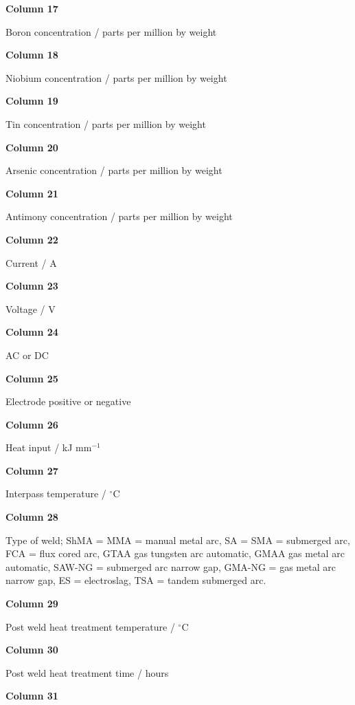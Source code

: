 \medskip
\item{} {\bf Column 17} 
\item{} \indent Boron concentration / parts per million by weight
\medskip
\item{} {\bf Column 18} 
\item{} \indent Niobium concentration / parts per million by weight
\medskip
\item{} {\bf Column 19} 
\item{} \indent Tin concentration / parts per million by weight
\medskip
\item{} {\bf Column 20} 
\item{} \indent Arsenic concentration / parts per million by weight
\medskip
\item{} {\bf Column 21} 
\item{} \indent Antimony concentration / parts per million by weight
\medskip
\item{} {\bf Column 22} 
\item{} \indent Current / A
\medskip
\item{} {\bf Column 23} 
\item{} \indent  Voltage / V
\medskip
\item{} {\bf Column 24} 
\item{} \indent AC or DC
\medskip
\item{} {\bf Column 25} 
\item{} \indent Electrode positive or negative
\medskip
\item{} {\bf Column 26}
\item{} \indent  Heat input / kJ mm$^{-1}$
\medskip
\item{} {\bf Column 27} 
\item{} \indent Interpass temperature / $^{\circ}$C
\medskip
\item{} {\bf Column 28} 
\item{} \indent Type of weld; ShMA = MMA = manual metal arc, SA = SMA = submerged arc, FCA = flux cored arc, GTAA gas tungsten arc automatic, GMAA gas metal arc automatic, SAW-NG = submerged arc narrow gap, GMA-NG = gas metal arc narrow gap, ES = electroslag, TSA = tandem submerged arc.
\medskip
\item{} {\bf Column 29} 
\item{} \indent  Post weld heat treatment temperature / $^{\circ}$C
\medskip
\item{} {\bf Column 30} 
\item{} \indent Post weld heat treatment time / hours
\medskip
\item{} {\bf Column 31} 

